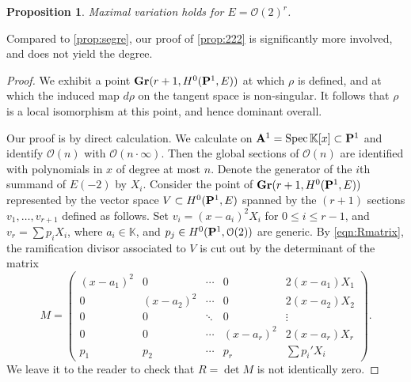 \documentclass[11pt,reqno]{amsart}
\theoremstyle{plain}
\newtheorem{proposition}[theorem]{Proposition}
\theoremstyle{definition}
\theoremstyle{remark}
\numberwithin{equation}{section}
\renewcommand{\k}{\mathbb{K}}
\numberwithin{equation}{section}
\renewcommand{\O}{\mathcal O}
\begin{document}
\begin{proposition}\label{prop:222}
  Maximal variation holds for $E = \O(2)^r$.
\end{proposition}
Compared to \autoref{prop:segre}, our proof of \autoref{prop:222} is significantly more involved, and does not yield the degree.
\begin{proof}
  We exhibit a point $\Gr(r+1, H^0(\P^1, E))$ at which $\rho$ is defined, and at which the induced map $d\rho$ on the tangent space is non-singular.
  It follows that $\rho$ is a local isomorphism at this point, and hence dominant overall.

  Our proof is by direct calculation.
  We calculate on $\A^1 = \spec \k[x] \subset \P^1$ and identify $\O(n)$ with $\O(n \cdot \infty)$.
  Then the global sections of $\O(n)$ are identified with polynomials in $x$ of degree at most $n$.
  Denote the generator of the $i$th summand of $E(-2)$ by $X_i$.
  Consider the point of $\Gr(r+1, H^0(\P^1, E))$ represented by the vector space $V \subset H^0(\P^1, E)$ spanned by the $(r+1)$ sections $v_1, \dots, v_{r+1}$ defined as follows.
  Set $v_i = (x-a_i)^2 X_i$ for $0 \leq i \leq r-1$, and $v_r = \sum p_i X_i$, where $a_i \in \k$, and $p_j \in H^0(\P^1, \O(2))$ are generic.
  By \eqref{eqn:Rmatrix}, the ramification divisor associated to $V$ is cut out by the determinant of the matrix
  \[
    M =
    \begin{pmatrix}
      (x-a_1)^2 & 0 &  \cdots & 0 & 2(x-a_1)X_1\\
      0 & (x-a_2)^2 & \cdots & 0 & 2(x-a_2)X_2\\
      0 & 0 & \ddots & 0 & \vdots\\
      0 & 0 & \cdots & (x-a_r)^2& 2(x-a_r)X_r\\
      p_1 & p_2 & \cdots & p_r & \sum p_i' X_i
    \end{pmatrix}.
  \]
  We leave it to the reader to check that $R = \det M$ is not identically zero.


\end{proof}
\end{document}
